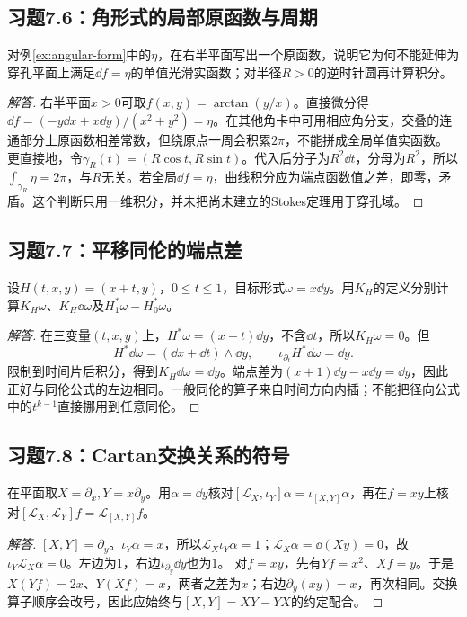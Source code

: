 \subsection*{习题7.6：角形式的局部原函数与周期}
对例\ref{ex:angular-form}中的$\eta$，在右半平面写出一个原函数，说明它为何不能延伸为穿孔平面上满足$\dd f=\eta$的单值光滑实函数；对半径$R>0$的逆时针圆再计算积分。
\begin{proof}[解答]
右半平面$x>0$可取$f(x,y)=\arctan(y/x)$。直接微分得$\dd f=(-y\dd x+x\dd y)/(x^2+y^2)=\eta$。在其他角卡中可用相应角分支，交叠的连通部分上原函数相差常数，但绕原点一周会积累$2\pi$，不能拼成全局单值实函数。
更直接地，令$\gamma_R(t)=(R\cos t,R\sin t)$。代入后分子为$R^2\dd t$，分母为$R^2$，所以$\int_{\gamma_R}\eta=2\pi$，与$R$无关。若全局$\dd f=\eta$，曲线积分应为端点函数值之差，即零，矛盾。这个判断只用一维积分，并未把尚未建立的Stokes定理用于穿孔域。
\end{proof}

\subsection*{习题7.7：平移同伦的端点差}
设$H(t,x,y)=(x+t,y)$，$0\leq t\leq1$，目标形式$\omega=x\dd y$。用$K_H$的定义分别计算$K_H\omega$、$K_H\dd\omega$及$H_1^*\omega-H_0^*\omega$。
\begin{proof}[解答]
在三变量$(t,x,y)$上，$H^*\omega=(x+t)\dd y$，不含$\dd t$，所以$K_H\omega=0$。但
\[
 H^*\dd\omega=(\dd x+\dd t)\wedge\dd y,
 \qquad\iota_{\partial_t}H^*\dd\omega=\dd y.
\]
限制到时间片后积分，得到$K_H\dd\omega=\dd y$。端点差为$(x+1)\dd y-x\dd y=\dd y$，因此正好与同伦公式的左边相同。一般同伦的算子来自时间方向内插；不能把径向公式中的$t^{k-1}$直接挪用到任意同伦。
\end{proof}

\subsection*{习题7.8：Cartan交换关系的符号}
在平面取$X=\partial_x,Y=x\partial_y$。用$\alpha=\dd y$核对$[\mathcal L_X,\iota_Y]\alpha=\iota_{[X,Y]}\alpha$，再在$f=xy$上核对$[\mathcal L_X,\mathcal L_Y]f=\mathcal L_{[X,Y]}f$。
\begin{proof}[解答]
$[X,Y]=\partial_y$。$\iota_Y\alpha=x$，所以$\mathcal L_X\iota_Y\alpha=1$；$\mathcal L_X\alpha=\dd(Xy)=0$，故$\iota_Y\mathcal L_X\alpha=0$。左边为$1$，右边$\iota_{\partial_y}\dd y$也为$1$。
对$f=xy$，先有$Yf=x^2$、$Xf=y$。于是$X(Yf)=2x$、$Y(Xf)=x$，两者之差为$x$；右边$\partial_y(xy)=x$，再次相同。交换算子顺序会改号，因此应始终与$[X,Y]=XY-YX$的约定配合。
\end{proof}
